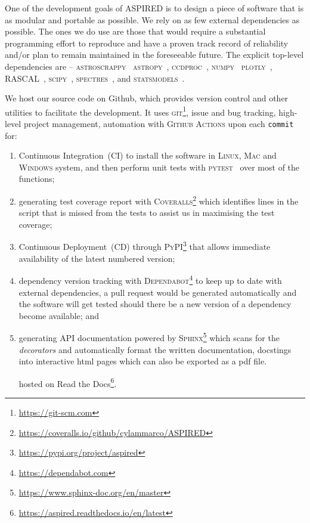 \documentclass[twocolumn, linenumbers]{aastex631}
\begin{document}
One of the development goals of \textsc{ASPIRED} is to design a piece of software that is as
modular and portable as possible. We rely on as few external dependencies as possible.
The ones we do use are those that would require a substantial programming effort to reproduce and have a
proven track record of reliability and/or plan to remain maintained in the
foreseeable future. The explicit top-level dependencies are --
\textsc{astroscrappy}~\citep{curtis_mccully_2018_1482019, 2001PASP..113.1420V}
\textsc{astropy}~\citep{astropy:2013, astropy:2018},
\textsc{ccdproc}~\citep{matt_craig_2017_1069648},
\textsc{numpy}~\citep{2020NumPy-Array}
\textsc{plotly}~\citep{plotly},
\textsc{RASCAL}~\citep{2020ASPC..527..627V},
\textsc{scipy}~\citep{2020SciPy-NMeth},
\textsc{spectres}~\citep{2017arXiv170505165C}, and
\textsc{statsmodels}~\citep{seabold2010statsmodels}. 

We host our source code on Github, which provides version control and other
utilities to facilitate the development. It uses \textsc{git}\footnote{\url{https://git-scm.com}},
issue and bug tracking, high-level project management, automation with \textsc{Github Actions}
upon each \texttt{commit} for:

\begin{enumerate}
    \item Continuous Integration~(CI) to install the software in \textsc{Linux},
    \textsc{Mac} and \textsc{Windows} system, and then perform unit tests with
    \textsc{pytest}~\citep{pytest6.2} over most of the functions;
    \item generating test coverage report with \textsc{Coveralls}\footnote{\url{
    https://coveralls.io/github/cylammarco/ASPIRED}} which identifies lines in
    the script that is missed from the tests to assist us in maximising the test
    coverage;
    \item Continuous Deployment~(CD) through \textsc{PyPI}\footnote{\url{
    https://pypi.org/project/aspired}} that allows immediate availability of the
    latest numbered version;
    \item dependency version tracking with \textsc{Dependabot}\footnote{\url{
    https://dependabot.com}} to keep up to date with external dependencies, a
    pull request would be generated automatically and the software will get
    tested should there be a new version of a dependency become available; and
    \item generating API documentation powered by \textsc{Sphinx}\footnote{\url{
    https://www.sphinx-doc.org/en/master}} which scans for the \textit{decorators}
    and automatically format the written documentation, docstings into
    interactive html pages which can also be exported as a pdf file.
    
    
    
    hosted on Read the Docs\footnote{\url{
    https://aspired.readthedocs.io/en/latest}}.
\end{enumerate}
\end{document}
